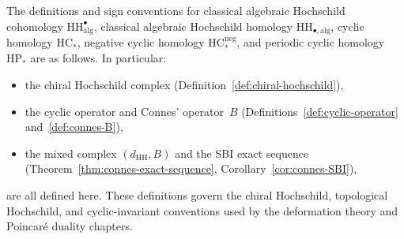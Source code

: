 \begin{remark}
\label{rem:hh-hc-canonical-source}
The definitions and sign conventions for classical algebraic
Hochschild cohomology $\mathrm{HH}^\bullet_{\mathrm{alg}}$,
classical algebraic Hochschild homology
$\mathrm{HH}_{\bullet,\mathrm{alg}}$, cyclic homology
$\mathrm{HC}_*$, negative cyclic homology $\mathrm{HC}_*^{\mathrm{neg}}$,
and periodic cyclic homology $\mathrm{HP}_*$ are as follows. In particular:
\begin{itemize}
\item the chiral Hochschild complex
 (Definition~\ref{def:chiral-hochschild}),
\item the cyclic operator and Connes' operator~$B$
 (Definitions~\ref{def:cyclic-operator} and~\ref{def:connes-B}),
\item the mixed complex $(d_{\mathrm{HH}}, B)$ and the SBI exact
 sequence (Theorem~\ref{thm:connes-exact-sequence},
 Corollary~\ref{cor:connes-SBI}),
\end{itemize}
are all defined here. These definitions govern the chiral Hochschild,
topological Hochschild, and cyclic-invariant conventions used by the
deformation theory and Poincar\'e duality chapters.
\end{remark}

